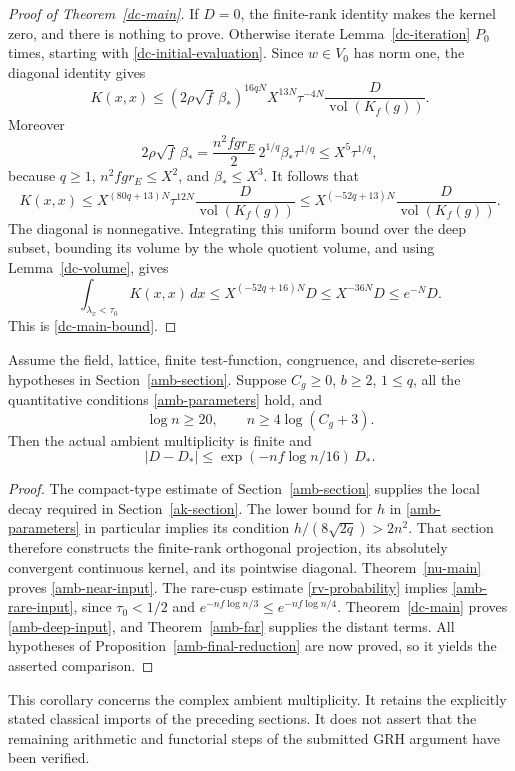 \begin{proof}[Proof of Theorem~\ref{dc-main}]
If \(D=0\), the finite-rank identity makes the kernel
zero, and there is nothing to prove.
Otherwise iterate Lemma~\ref{dc-iteration} \(P_0\)
times, starting with \eqref{dc-initial-evaluation}.
Since \(w\in V_0\) has norm one, the diagonal identity
gives
\[
 K(x,x)\le(2\rho\sqrt f\,\beta_*)^{16qN}
       X^{13N}\tau^{-4N}
                   \frac{D}{\operatorname{vol}(K_f(g))}.
\]
Moreover
\[
 2\rho\sqrt f\,\beta_*
   =\frac{n^2fgr_E}{2}\,2^{1/q}\beta_*\tau^{1/q}
                         \le X^5\tau^{1/q},
\]
because \(q\ge1\), \(n^2fgr_E\le X^2\),
and \(\beta_*\le X^3\).
It follows that
\[
 K(x,x)\le
 X^{(80q+13)N}\tau^{12N}
                   \frac{D}{\operatorname{vol}(K_f(g))}
 \le X^{(-52q+13)N}
                   \frac{D}{\operatorname{vol}(K_f(g))}.
\]
The diagonal is nonnegative.  Integrating this
uniform bound over the deep subset, bounding its
volume by the whole quotient volume, and using
Lemma~\ref{dc-volume}, gives
\[
 \int_{\lambda_x<\tau_0}K(x,x)\,dx
 \le X^{(-52q+16)N}D
 \le X^{-36N}D
 \le e^{-N}D.
\]
This is \eqref{dc-main-bound}.
\end{proof}

\begin{corollary}\label{dc-ambient-comparison}
Assume the field, lattice, finite test-function,
congruence, and discrete-series hypotheses in
Section~\ref{amb-section}.  Suppose \(C_g\ge0\),
\(b\ge2\), \(1\le q\), all the quantitative conditions
\eqref{amb-parameters} hold, and
\[
              \log n\ge20,\qquad n\ge4\log(C_g+3).
\]
Then the actual ambient multiplicity is finite and
\[
             |D-D_*|\le
                    \exp(-nf\log n/16)\,D_*.
\]
\end{corollary}
\begin{proof}
The compact-type estimate of Section~\ref{amb-section}
supplies the local decay required in
Section~\ref{ak-section}.  The lower bound for \(h\)
in \eqref{amb-parameters} in particular implies its
condition \(h/(8\sqrt{2q})>2n^2\).
That section therefore constructs the finite-rank
orthogonal projection, its absolutely convergent
continuous kernel, and its pointwise diagonal.
Theorem~\ref{nu-main} proves \eqref{amb-near-input}.
The rare-cusp estimate \eqref{rv-probability} implies
\eqref{amb-rare-input}, since
\(\tau_0<1/2\) and \(e^{-nf\log n/3}\le e^{-nf\log n/4}\).
Theorem~\ref{dc-main} proves \eqref{amb-deep-input},
and Theorem~\ref{amb-far} supplies the distant terms.
All hypotheses of Proposition~\ref{amb-final-reduction}
are now proved, so it yields the asserted comparison.
\end{proof}

This corollary concerns the complex ambient multiplicity.
It retains the explicitly stated classical imports of
the preceding sections.  It does not assert that
the remaining arithmetic and functorial steps of
the submitted GRH argument have been verified.


